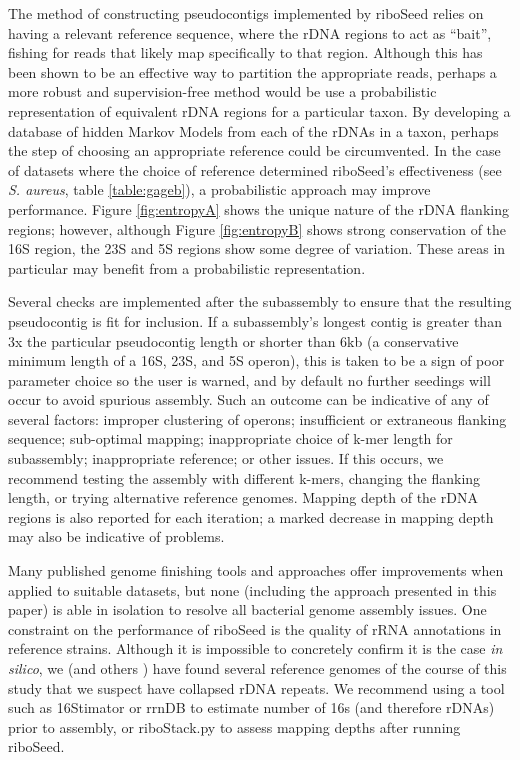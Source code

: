 \documentclass[10pt]{article}
\begin{document}
\begin{linenumbers}
The method of constructing pseudocontigs implemented by riboSeed relies on having a relevant reference sequence, where the rDNA regions to act as ``bait'', fishing for reads that likely map specifically to that region. Although this has been shown to be an effective way to partition the appropriate reads, perhaps a more robust and supervision-free method would be use a probabilistic representation of equivalent rDNA regions for a particular taxon. By developing a database of hidden Markov Models from each of the rDNAs in a taxon, perhaps the step of choosing an appropriate reference could be circumvented. In the case of datasets where the choice of reference determined riboSeed's effectiveness (see \textit{S. aureus}, table \ref{table:gageb}), a probabilistic approach may improve performance. Figure \ref{fig:entropyA} shows the unique nature of the rDNA flanking regions; however, although Figure \ref{fig:entropyB} shows strong conservation of the 16S region, the 23S and 5S regions show some degree of variation. These areas in particular may benefit from a probabilistic representation.


Several checks are implemented after the subassembly to ensure that the resulting pseudocontig is fit for inclusion. If a subassembly's longest contig is greater than 3x the particular pseudocontig length or shorter than 6kb (a conservative minimum length of a 16S, 23S, and 5S operon), this is taken to be a sign of poor parameter choice so the user is warned, and by default no further seedings will occur to avoid spurious assembly. Such an outcome can be indicative of any of several factors: improper clustering of operons; insufficient or extraneous flanking sequence; sub-optimal mapping; inappropriate choice of k-mer length for subassembly; inappropriate reference; or other issues. If this occurs, we recommend testing the assembly with different k-mers, changing the flanking length, or trying alternative reference genomes. Mapping depth of the rDNA regions is also reported for each iteration; a marked decrease in mapping depth may also be indicative of problems.


Many published genome finishing tools and approaches offer improvements when applied to suitable datasets, but none (including the approach presented in this paper) is able in isolation to resolve all bacterial genome assembly issues. One constraint on the performance of riboSeed is the quality of rRNA annotations in reference strains. Although it is impossible to concretely confirm it is the case \textit{in silico}, we (and others \cite{Mariano2016}) have found several reference genomes of the course of this study that we suspect have collapsed rDNA repeats. We recommend using a tool such as 16Stimator\cite{Perisin2016} or rrnDB\cite{Stoddard2014} to estimate number of 16s (and therefore rDNAs) prior to assembly, or riboStack.py to assess mapping depths after running riboSeed.


\end{linenumbers}
\end{document}
